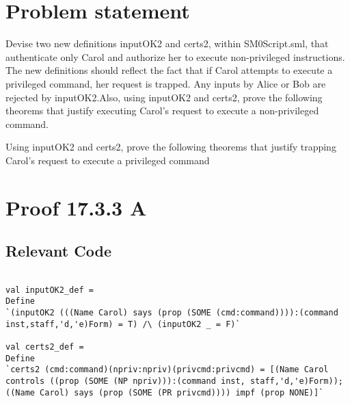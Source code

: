 \documentclass{report}
\begin{document}
\section{Problem statement}
\label{problem-statement-2}
Devise two new definitions inputOK2 and certs2, within SM0Script.sml, that authenticate only Carol
and authorize her to execute non-privileged instructions. The new definitions should reflect the fact that
if Carol attempts to execute a privileged command, her request is trapped. Any inputs by Alice or Bob
are rejected by inputOK2.Also, using inputOK2 and certs2, prove the following theorems that justify executing Carol’s request to execute
a non-privileged command.

\begin{quote}
\HOLSMZeroSolutionsTheoremsCarolXXnprivXXlemma
{}\HOLSMZeroSolutionsTheoremsCarolXXexecXXnprivXXjustifiedXXthm
{}\HOLSMZeroSolutionsTheoremsCarolXXnprivXXverifiedXXthm
{}\HOLSMZeroSolutionsTheoremsCarolXXjustifiedXXnprivXXexecXXthm
\end{quote}

Using inputOK2 and certs2, prove the following theorems that justify trapping Carol’s request to execute
a privileged command

\begin{quote}
\HOLSMZeroSolutionsTheoremsCarolXXprivcmdXXtrapXXlemma
{}\HOLSMZeroSolutionsTheoremsCarolXXtrapXXprivcmdXXjustifiedXXthm
{}\HOLSMZeroSolutionsTheoremsCarolXXprivcmdXXtrappedXXthm
{}\HOLSMZeroSolutionsTheoremsCarolXXjustifiedXXprivcmdXXtrapXXthm
\end{quote}

\section{Proof 17.3.3 A}
\label{proof-5}

\subsection{Relevant Code}
\label{rel-code-5}
\begin{lstlisting}[frame=TBlr]

val inputOK2_def =
Define
`(inputOK2 (((Name Carol) says (prop (SOME (cmd:command)))):(command inst,staff,'d,'e)Form) = T) /\ (inputOK2 _ = F)`

val certs2_def =
Define
`certs2 (cmd:command)(npriv:npriv)(privcmd:privcmd) = [(Name Carol controls ((prop (SOME (NP npriv))):(command inst, staff,'d,'e)Form)); ((Name Carol) says (prop (SOME (PR privcmd)))) impf (prop NONE)]`

\end{lstlisting}
\end{document}
